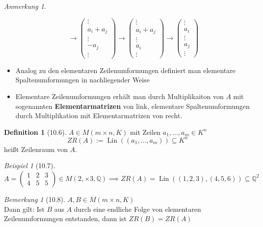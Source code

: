 \documentclass[a4paper]{scrartcl}
\DeclareMathOperator{\Lin}{Lin}
\theoremstyle{definition}
\newtheorem{defn}{Definition}
\theoremstyle{plain}
\theoremstyle{plain}
\theoremstyle{remark}
\newtheorem{remark}{Bemerkung}
\theoremstyle{remark}
\newtheorem{note}{Anmerkung}
\theoremstyle{remark}
\theoremstyle{remark}
\theoremstyle{remark}
\newtheorem{ex}{Beispiel}
\begin{document}
\begin{note}
\begin{itemize}
\begin{equation}
\to \begin{pmatrix} \vdots \\ a_i + a_j \\ \vdots \\ -a_j  \\ \vdots \end{pmatrix}
\to \begin{pmatrix} \vdots \\ a_i + a_j \\ \vdots \\ a_i  \\ \vdots \end{pmatrix}
\to \begin{pmatrix} \vdots \\ a_i \\ \vdots \\ a_j  \\ \vdots \end{pmatrix}
\end{equation}
\item Analog zu den elementaren Zeilenumformungen definiert man elementare Spaltenumformungen in nachliegender Weise
\item Elementare Zeilenumformungen erhält man durch Multiplikaiton von $A$ mit sogenannten \textbf{Elementarmatrizen} von link,
elementare Spaltenumformungen durch Multiplikation mit Elementarmatrizen von recht.
\end{itemize}
\end{note}
\begin{defn}[10.6]
$A\in M(m\times n, K)$ mit Zeilen $a_1, \ldots, a_m \in K^n$ \\
  \[ZR(A) := \Lin((a_1, \ldots, a_m)) \subseteq K^n\]
heißt Zeilenraum von $A$.
\end{defn}
\begin{ex}[10.7]
\begin{equation}
A = \begin{pmatrix} 1 & 2 & 3 \\ 4 & 5 & 5 \end{pmatrix} \in M(2,\times 3, \mathbb{Q}) \implies ZR(A) = \Lin((1,2,3), (4,5,6)) \subseteq \mathbb{Q}^2
\end{equation}
\end{ex}
\begin{remark}[10.8]
$A,B \in M(m\times n, K)$ \\
  Dann gilt: Ist $B$ aus $A$ durch eine endliche Folge von elementaren Zeilenumformungen entstanden, dann ist $ZR(B) = ZR(A)$
\end{remark}
\end{document}
